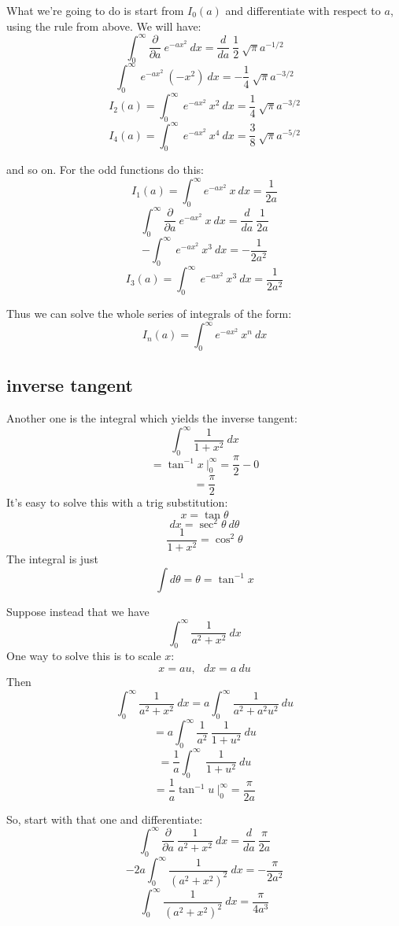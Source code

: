 \documentclass[11pt, oneside]{article}
\begin{document}
What we're going to do is start from $I_0(a)$ and differentiate with respect to $a$, using the rule from above.  We will have:
\[ \int_0^{\infty} \frac{\partial}{\partial a} \ e^{-ax^2} \ dx = \frac{d}{da} \  \frac{1}{2} \ \sqrt{\pi} a^{-1/2} \]
\[ \int_0^{\infty} \ e^{-ax^2} \ (-x^2) \ dx = -\frac{1}{4} \ \sqrt{\pi} a^{-3/2} \]
\[ I_2(a) = \int_0^{\infty} \ e^{-ax^2} \ x^2 \ dx = \frac{1}{4} \ \sqrt{\pi} a^{-3/2} \]
\[ I_4(a) = \int_0^{\infty} \ e^{-ax^2} \ x^4 \ dx = \frac{3}{8} \ \sqrt{\pi} a^{-5/2} \]

and so on.  For the odd functions do this:
\[ I_1(a) = \int_0^{\infty} e^{-ax^2} \ x \ dx = \frac{1}{2a} \]
\[ \int_0^{\infty} \frac{\partial}{\partial a} \ e^{-ax^2} \ x \ dx = \frac{d}{da} \ \frac{1}{2a} \]
\[ - \int_0^{\infty} \ e^{-ax^2} \ x^3 \ dx = - \frac{1}{2a^2} \]
\[ I_3(a) = \int_0^{\infty} \ e^{-ax^2} \ x^3 \ dx = \frac{1}{2a^2} \]

Thus we can solve the whole series of integrals of the form:
\[ I_n(a) = \int_0^{\infty} e^{-ax^2} \ x^n\ dx \]


\subsection*{inverse tangent}
Another one is the integral which yields the inverse tangent:
\[ \int_0^{\infty} \frac{1}{1 + x^2} \ dx \]
\[ = \tan^{-1} x \ \bigg |_0^{\infty} = \frac{\pi}{2} - 0 \]
\[ =  \frac{\pi}{2} \]
It's easy to solve this with a trig substitution:
\[ x = \tan \theta \]
\[ dx = \sec^2 \theta \ d \theta \]
\[ \frac{1}{1 + x^2} = \cos^2 \theta \]
The integral is just
\[ \int d \theta = \theta = \tan^{-1} x \]

Suppose instead that we have
\[ \int_0^{\infty} \frac{1}{a^2 + x^2} \ dx \]
One way to solve this is to scale $x$:
\[ x = au, \ \ \ dx = a \ du \]
Then
\[ \int_0^{\infty} \frac{1}{a^2 + x^2} \ dx = a \int_0^{\infty} \frac{1}{a^2 + a^2u^2} \ du \]
\[ = a \int_0^{\infty} \frac{1}{a^2} \ \frac{1}{1 + u^2} \ du \]
\[ = \frac{1}{a} \int_0^{\infty} \ \frac{1}{1 + u^2} \ du \]
\[ = \frac{1}{a} \tan^{-1} u \ \bigg |_0^{\infty} = \frac{\pi}{2a} \]

So, start with that one and differentiate:
\[ \int_0^{\infty} \frac{\partial}{\partial a} \ \frac{1}{a^2 + x^2} \ dx = \frac{d}{da} \ \frac{\pi}{2a} \]
\[ - 2a \int_0^{\infty} \frac{1}{(a^2 + x^2)^2} \ dx = - \frac{\pi}{2a^2} \]
\[ \int_0^{\infty} \frac{1}{(a^2 + x^2)^2} \ dx = \frac{\pi}{4a^3} \]
\end{document}
